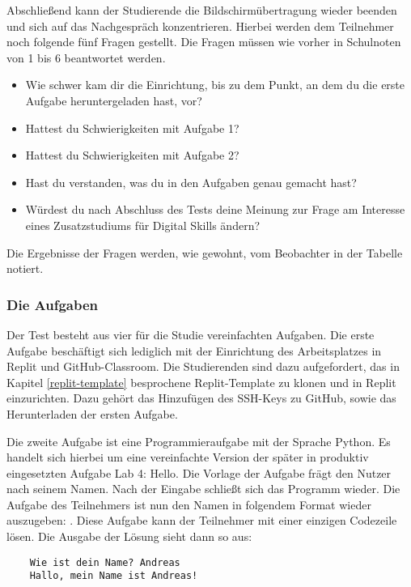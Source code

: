 Abschließend kann der Studierende die Bildschirmübertragung wieder beenden und
sich auf das Nachgespräch konzentrieren. Hierbei werden dem Teilnehmer noch
folgende fünf Fragen gestellt. Die Fragen müssen wie vorher in Schulnoten von 1
bis 6 beantwortet werden.
\begin{itemize}
    \item Wie schwer kam dir die Einrichtung, bis zu dem Punkt, an dem du die erste Aufgabe heruntergeladen hast, vor?
    \item Hattest du Schwierigkeiten mit Aufgabe 1?
    \item Hattest du Schwierigkeiten mit Aufgabe 2?
    \item Hast du verstanden, was du in den Aufgaben genau gemacht hast?
    \item Würdest du nach Abschluss des Tests deine Meinung zur Frage am
    Interesse eines Zusatzstudiums für Digital Skills ändern?
\end{itemize}

Die Ergebnisse der Fragen werden, wie gewohnt, vom Beobachter in der Tabelle
notiert.

\subsubsection{Die Aufgaben}\label{studie-aufgaben}
Der Test besteht aus vier für die Studie vereinfachten Aufgaben. Die erste
Aufgabe beschäftigt sich lediglich mit der Einrichtung des Arbeitsplatzes in
Replit und GitHub-Classroom. Die Studierenden sind dazu aufgefordert, das in 
Kapitel \ref{replit-template} besprochene Replit-Template zu klonen und in 
Replit einzurichten. Dazu gehört das Hinzufügen des SSH-Keys zu GitHub, sowie
das Herunterladen der ersten Aufgabe.

Die zweite Aufgabe ist eine Programmieraufgabe mit der Sprache Python. Es
handelt sich hierbei um eine vereinfachte Version der später in produktiv
eingesetzten Aufgabe \glqq Lab 4: Hello\grqq{}. Die Vorlage der Aufgabe
frägt den Nutzer nach seinem Namen. Nach der Eingabe schließt sich das Programm
wieder. Die Aufgabe des Teilnehmers ist nun den Namen in folgendem Format
wieder auszugeben: . Diese Aufgabe kann der
Teilnehmer mit einer einzigen Codezeile lösen. Die Ausgabe der Lösung sieht dann
so aus:

\begin{lstlisting}
    Wie ist dein Name? Andreas
    Hallo, mein Name ist Andreas!
\end{lstlisting}

